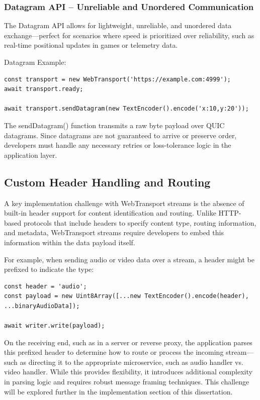 \subsubsection{Datagram API – Unreliable and Unordered Communication}

The Datagram API allows for lightweight, unreliable, and unordered data exchange—perfect for scenarios where speed is prioritized over reliability, such as real-time positional updates in games or telemetry data.

Datagram Example:

\begin{lstlisting}[breaklines=true,basicstyle=\small\ttfamily,frame=single]
const transport = new WebTransport('https://example.com:4999');
await transport.ready;

await transport.sendDatagram(new TextEncoder().encode('x:10,y:20'));
\end{lstlisting}

The sendDatagram() function transmits a raw byte payload over QUIC datagrams. Since datagrams are not guaranteed to arrive or preserve order, developers must handle any necessary retries or loss-tolerance logic in the application layer.

\subsection{Custom Header Handling and Routing}

A key implementation challenge with WebTransport streams is the absence of built-in header support for content identification and routing. Unlike HTTP-based protocols that include headers to specify content type, routing information, and metadata, WebTransport streams require developers to embed this information within the data payload itself.

For example, when sending audio or video data over a stream, a header might be prefixed to indicate the type:

\begin{lstlisting}[breaklines=true,basicstyle=\small\ttfamily,frame=single]
const header = 'audio';
const payload = new Uint8Array([...new TextEncoder().encode(header), ...binaryAudioData]);

await writer.write(payload);
\end{lstlisting}

On the receiving end, such as in a server or reverse proxy, the application parses this prefixed header to determine how to route or process the incoming stream—such as directing it to the appropriate microservice, such as audio handler vs. video handler. While this provides flexibility, it introduces additional complexity in parsing logic and requires robust message framing techniques. This challenge will be explored further in the implementation section of this dissertation.

